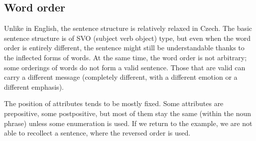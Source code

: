 \subsection{Word order}
Unlike in English, the sentence structure is relatively relaxed in Czech. The basic sentence structure is of SVO (subject verb object) type, but even when the word order is entirely different, the sentence might still be understandable thanks to the inflected forms of words. At the same time, the word order is not arbitrary; some orderings of words do not form a valid sentence. Those that are valid can carry a different message (completely different, with a different emotion or a different emphasis).

The position of attributes tends to be mostly fixed. Some attributes are prepositive, some postpositive, but most of them stay the same (within the noun phrase) unless some enumeration is used. If we return to the  example, we are not able to recollect a sentence, where the reversed order is used.

